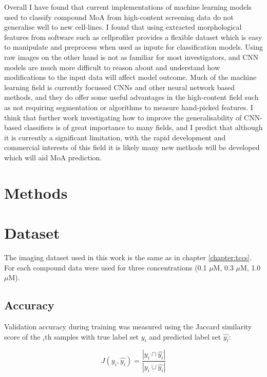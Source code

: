\documentclass[a4paper,11pt,twoside,openright]{scrbook}
\begin{document}
Overall I have found that current implementations of machine learning models used to classify compound MoA from high-content screening data do not generalise well to new cell-lines.
I found that using extracted morphological features from software such as cellprofiler provides a flexible dataset which is easy to manipulate and preprocess when used as inpute for classification models.
Using raw images on the other hand is not as familiar for most investigators, and CNN models are much more difficult to reason about and understand how modifications to the input data will affect model outcome.
Much of the machine learning field is currently focussed CNNs and other neural network based methods, and they do offer some useful advantages in the high-content field such as not requiring segmentation or algorithms to measure hand-picked features.
I think that further work investigating how to improve the generalisability of CNN-based classifiers is of great importance to many fields, and I predict that although it is currently a significant limitation, with the rapid development and commercial interests of this field it is likely many new methods will be developed which will aid MoA prediction.





\section{Methods}

\section{Dataset}
The imaging dataset used in this work is the same as in chapter \ref{chapter:tccs}.
For each compound data were used for three concentrations (0.1 $\mu$M, 0.3 $\mu$M, 1.0 $\mu$M).


\subsection{Accuracy}
Validation accuracy during training was measured using the Jaccard similarity score of the $_i$th samples with true label set $y_i$ and predicted label set $\hat{y_i}$:

\begin{equation}
    J(y_i, \hat{y_i}) = \frac{|y_i \cap \hat{y_i}|}{|y_i \cup \hat{y_i}|}
\end{equation}
\end{document}
